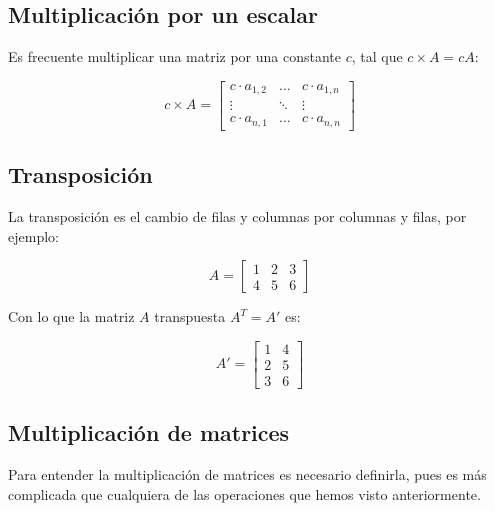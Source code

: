 \documentclass[
]{book}
\begin{document}
\hypertarget{multiplicaciuxf3n-por-un-escalar}{%
\subsection{Multiplicación por un escalar}\label{multiplicaciuxf3n-por-un-escalar}}

Es frecuente multiplicar una matriz por una constante \(c\), tal que \(c \times A = cA\):

\begin{equation}
c \times A = \left[ 
\begin{array}{ccc}
c  \cdot  a_{1, 2} & \dots & c \cdot a_{1, n} \\
\vdots   & \ddots & \vdots \\
c \cdot  a_{n, 1} & \dots & c  \cdot  a_{n, n}
\end{array} \right]
\end{equation}

\hypertarget{transposiciuxf3n}{%
\subsection{Transposición}\label{transposiciuxf3n}}

La transposición es el cambio de filas y columnas por columnas y filas, por ejemplo:

\begin{equation}
A = \left[ 
\begin{array}{rrr}
1 & 2 & 3 \\
4 & 5 & 6
\end{array}
\right]
\end{equation}

Con lo que la matriz \(A\) transpuesta \(A^T = A'\) es:

\begin{equation}
A' = \left[
\begin{array}{rr}
1 & 4 \\
2 & 5 \\
3 & 6
\end{array}
\right]
\end{equation}

\hypertarget{multiplicaciuxf3n-de-matrices}{%
\subsection{Multiplicación de matrices}\label{multiplicaciuxf3n-de-matrices}}

Para entender la multiplicación de matrices es necesario definirla, pues es más complicada que cualquiera de las operaciones que hemos visto anteriormente.
\end{document}
